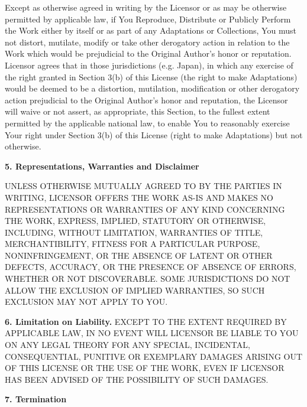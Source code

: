 \begin{doclicense@enumerate}
\item Except as otherwise agreed in writing by the Licensor
or as may be otherwise permitted by applicable law, if
You Reproduce, Distribute or Publicly Perform the Work
either by itself or as part of any Adaptations or
Collections, You must not distort, mutilate, modify or
take other derogatory action in relation to the Work
which would be prejudicial to the Original Author's honor
or reputation. Licensor agrees that in those
jurisdictions (e.g. Japan), in which any exercise of the
right granted in Section 3(b) of this License (the right
to make Adaptations) would be deemed to be a distortion,
mutilation, modification or other derogatory action
prejudicial to the Original Author's honor and
reputation, the Licensor will waive or not assert, as
appropriate, this Section, to the fullest extent
permitted by the applicable national law, to enable You
to reasonably exercise Your right under Section 3(b) of
this License (right to make Adaptations) but not
otherwise.
\end{doclicense@enumerate}
\par \textbf{5. Representations, Warranties and
Disclaimer}
\par UNLESS OTHERWISE MUTUALLY AGREED TO BY THE PARTIES IN
WRITING, LICENSOR OFFERS THE WORK AS-IS AND MAKES NO
REPRESENTATIONS OR WARRANTIES OF ANY KIND CONCERNING THE
WORK, EXPRESS, IMPLIED, STATUTORY OR OTHERWISE, INCLUDING,
WITHOUT LIMITATION, WARRANTIES OF TITLE, MERCHANTIBILITY,
FITNESS FOR A PARTICULAR PURPOSE, NONINFRINGEMENT, OR THE
ABSENCE OF LATENT OR OTHER DEFECTS, ACCURACY, OR THE
PRESENCE OF ABSENCE OF ERRORS, WHETHER OR NOT DISCOVERABLE.
SOME JURISDICTIONS DO NOT ALLOW THE EXCLUSION OF IMPLIED
WARRANTIES, SO SUCH EXCLUSION MAY NOT APPLY TO YOU.
\par \textbf{6. Limitation on Liability.} EXCEPT TO
THE EXTENT REQUIRED BY APPLICABLE LAW, IN NO EVENT WILL
LICENSOR BE LIABLE TO YOU ON ANY LEGAL THEORY FOR ANY
SPECIAL, INCIDENTAL, CONSEQUENTIAL, PUNITIVE OR EXEMPLARY
DAMAGES ARISING OUT OF THIS LICENSE OR THE USE OF THE WORK,
EVEN IF LICENSOR HAS BEEN ADVISED OF THE POSSIBILITY OF
SUCH DAMAGES.
\par \textbf{7. Termination}
